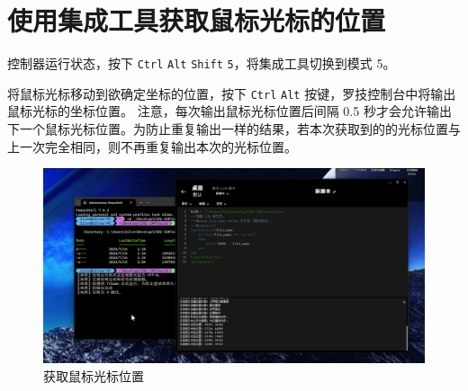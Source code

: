 \section{使用集成工具获取鼠标光标的位置}

控制器运行状态，按下 \lstinline{Ctrl} \lstinline{Alt} \lstinline{Shift} \lstinline{5}，将集成工具切换到模式 5。

将鼠标光标移动到欲确定坐标的位置，按下 \lstinline{Ctrl} \lstinline{Alt} 按键，罗技控制台中将输出鼠标光标的坐标位置。
注意，每次输出鼠标光标位置后间隔 0.5 秒才会允许输出下一个鼠标光标位置。为防止重复输出一样的结果，若本次获取到的的光标位置与上一次完全相同，则不再重复输出本次的光标位置。

\begin{figure}[H]
    \Centering
    \includegraphics[width=\textwidth]{docs/assets/position.png}
    \caption{获取鼠标光标位置}
\end{figure}